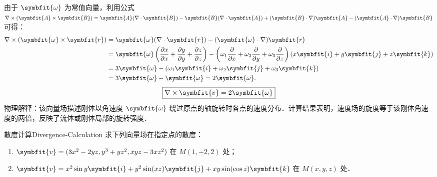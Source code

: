 \begin{solution}
    由于 $\symbfit{\omega}$ 为常值向量，利用公式 $\nabla \times (\symbfit{A} \times \symbfit{B}) = \symbfit{A}(\nabla \cdot \symbfit{B}) - \symbfit{B}(\nabla \cdot \symbfit{A}) + (\symbfit{B} \cdot \nabla) \symbfit{A} - (\symbfit{A} \cdot \nabla) \symbfit{B}$ 可得：
    \begin{equation}
        \begin{aligned}
            \nabla \times (\symbfit{\omega} \times \symbfit{r}) & = \symbfit{\omega} (\nabla \cdot \symbfit{r}) - (\symbfit{\omega} \cdot \nabla) \symbfit{r}                                                                                                                                                                                                                         \\
                                                                & = \symbfit{\omega} \left( \frac{\partial x}{\partial x} + \frac{\partial y}{\partial y} + \frac{\partial z}{\partial z} \right) - \left( \omega_1 \frac{\partial}{\partial x} + \omega_2 \frac{\partial}{\partial y} + \omega_3 \frac{\partial}{\partial z} \right) (x \symbfit{i} + y \symbfit{j} + z \symbfit{k}) \\
                                                                & = 3 \symbfit{\omega} - (\omega_1 \symbfit{i} + \omega_2 \symbfit{j} + \omega_3 \symbfit{k})                                                                                                                                                                                                                         \\
                                                                & = 3 \symbfit{\omega} - \symbfit{\omega} = 2 \symbfit{\omega}.
        \end{aligned}
    \end{equation}
    \begin{equation}
        \boxed{\nabla \times \symbfit{v} = 2 \symbfit{\omega}}
    \end{equation}
    物理解释：该向量场描述刚体以角速度 $\symbfit{\omega}$ 绕过原点的轴旋转时各点的速度分布．计算结果表明，速度场的旋度等于该刚体角速度的两倍，反映了流体或刚体局部的旋转强度．
\end{solution}


\begin{problem}{散度计算}{Divergence-Calculation}
    求下列向量场在指定点的散度：
    \begin{enumerate}
        \item $\symbfit{v} = (3x^2 - 2yz, y^3 + yz^2, xyz - 3xz^2)$ 在 $M(1, -2, 2)$ 处；
        \item $\symbfit{v} = x^2 \sin y \symbfit{i} + y^2 \sin(xz) \symbfit{j} + xy \sin(\cos z) \symbfit{k}$ 在 $M(x, y, z)$ 处．
    \end{enumerate}
\end{problem}

